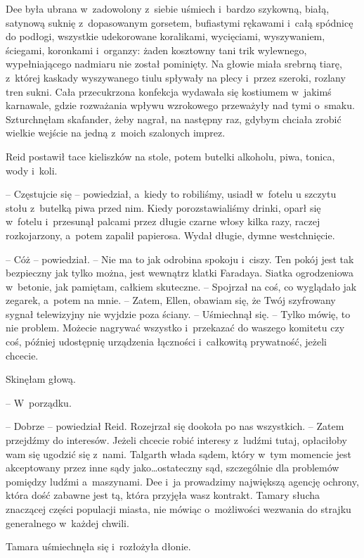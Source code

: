 \documentclass[oneside,polish,11pt,sfheadings]{mwbk}
\begin{document}
Dee była ubrana w~zadowolony z~siebie uśmiech i~bardzo szykowną, białą,
satynową suknię z~dopasowanym gorsetem, bufiastymi rękawami i~całą
spódnicę do podłogi, wszystkie udekorowane koralikami, wycięciami,
wyszywaniem, ściegami, koronkami i~organzy: żaden kosztowny tani trik
wylewnego, wypełniającego nadmiaru nie został pominięty. Na głowie miała
srebrną tiarę, z~której kaskady wyszywanego tiulu spływały na plecy i~przez szeroki, rozlany tren sukni. Cała przecukrzona konfekcja wydawała
się kostiumem w~jakimś karnawale, gdzie rozważania wpływu wzrokowego
przeważyły nad tymi o~smaku. Szturchnęłam skafander, żeby nagrał, na
następny raz, gdybym chciała zrobić wielkie wejście na jedną z~moich
szalonych imprez.

Reid postawił tace kieliszków na stole, potem butelki alkoholu, piwa,
tonica, wody i~koli. 

-- Częstujcie się -- powiedział, a~kiedy to
robiliśmy, usiadł w~fotelu u szczytu stołu z~butelką piwa przed nim.
Kiedy porozstawialiśmy drinki, oparł się w~fotelu i~przesunął palcami
przez długie czarne włosy kilka razy, raczej rozkojarzony, a~potem
zapalił papierosa. Wydał długie, dymne westchnięcie.

-- Cóż -- powiedział. -- Nie ma to jak odrobina spokoju i~ciszy. Ten pokój
jest tak bezpieczny jak tylko można, jest wewnątrz klatki Faradaya.
Siatka ogrodzeniowa w~betonie, jak pamiętam, całkiem skuteczne. -- Spojrzał na coś, co wyglądało jak zegarek, a~potem na mnie. -- Zatem,
Ellen, obawiam się, że Twój szyfrowany sygnał telewizyjny nie wyjdzie
poza ściany. -- Uśmiechnął się. -- Tylko mówię, to nie problem. Możecie
nagrywać wszystko i~przekazać do waszego komitetu czy coś, później
udostępnię urządzenia łączności i~całkowitą prywatność, jeżeli chcecie.

Skinęłam głową. 

-- W~porządku.

-- Dobrze -- powiedział Reid. Rozejrzał się dookoła po nas wszystkich. -- Zatem przejdźmy do interesów. Jeżeli chcecie robić interesy z~ludźmi
tutaj, opłaciłoby wam się ugodzić się z~nami. Talgarth włada sądem,
który w~tym momencie jest akceptowany przez inne sądy jako\ldots  ostateczny
sąd, szczególnie dla problemów pomiędzy ludźmi a~maszynami. Dee i~ja
prowadzimy największą agencję ochrony, która dość zabawne jest tą, która
przyjęła wasz kontrakt. Tamary słucha znaczącej części populacji miasta,
nie mówiąc o~możliwości wezwania do strajku generalnego w~każdej chwili.

Tamara uśmiechnęła się i~rozłożyła dłonie. 
\end{document}
